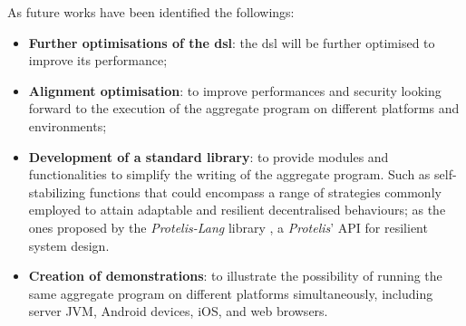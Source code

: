 As future works have been identified the followings:
\begin{itemize}
    \item \textbf{Further optimisations of the \ac{dsl}}: the \ac{dsl} will be further optimised to improve its performance;
    \item \textbf{Alignment optimisation}: to improve performances and security looking forward to the execution of the aggregate
        program on different platforms and environments;
    \item \textbf{Development of a standard library}: to provide modules and functionalities to simplify the writing of the aggregate program.
        Such as self-stabilizing functions that could encompass a range of strategies commonly employed to attain adaptable
        and resilient decentralised behaviours; as the ones proposed by the \emph{Protelis-Lang} library \cite{8064092},
        a \emph{Protelis}' API for resilient system design.
    \item \textbf{Creation of demonstrations}: to illustrate the possibility of running the same aggregate program on
        different platforms simultaneously, including server JVM, Android devices, iOS, and web browsers.
\end{itemize}

